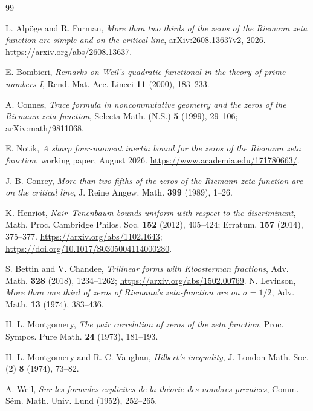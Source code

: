 \documentclass[UTF8,11pt,a4paper]{ctexart}
\theoremstyle{definition}
\theoremstyle{remark}
\begin{document}
\begin{thebibliography}{99}

L. Alpöge and R. Furman,
\emph{More than two thirds of the zeros of the Riemann zeta function are
simple and on the critical line},
arXiv:2608.13637v2, 2026.
\url{https://arxiv.org/abs/2608.13637}.

E. Bombieri,
\emph{Remarks on Weil's quadratic functional in the theory of prime numbers I},
Rend. Mat. Acc. Lincei \textbf{11} (2000), 183--233.

A. Connes,
\emph{Trace formula in noncommutative geometry and the zeros of the
Riemann zeta function},
Selecta Math. (N.S.) \textbf{5} (1999), 29--106;
arXiv:math/9811068.

E. Notik,
\emph{A sharp four-moment inertia bound for the zeros of the Riemann
zeta function},
working paper, August 2026.
\url{https://www.academia.edu/171780663/}.

J. B. Conrey,
\emph{More than two fifths of the zeros of the Riemann zeta function are on
the critical line},
J. Reine Angew. Math. \textbf{399} (1989), 1--26.

K. Henriot,
\emph{Nair--Tenenbaum bounds uniform with respect to the discriminant},
Math. Proc. Cambridge Philos. Soc. \textbf{152} (2012), 405--424;
Erratum, \textbf{157} (2014), 375--377.
\url{https://arxiv.org/abs/1102.1643};
\url{https://doi.org/10.1017/S0305004114000280}.

S. Bettin and V. Chandee,
\emph{Trilinear forms with Kloosterman fractions},
Adv. Math. \textbf{328} (2018), 1234--1262;
\url{https://arxiv.org/abs/1502.00769}.
N. Levinson,
\emph{More than one third of zeros of Riemann's zeta-function are on
$\sigma=1/2$},
Adv. Math. \textbf{13} (1974), 383--436.

H. L. Montgomery,
\emph{The pair correlation of zeros of the zeta function},
Proc. Sympos. Pure Math. \textbf{24} (1973), 181--193.

H. L. Montgomery and R. C. Vaughan,
\emph{Hilbert's inequality},
J. London Math. Soc. (2) \textbf{8} (1974), 73--82.

A. Weil,
\emph{Sur les formules explicites de la théorie des nombres premiers},
Comm. Sém. Math. Univ. Lund (1952), 252--265.

\end{thebibliography}
\end{document}
